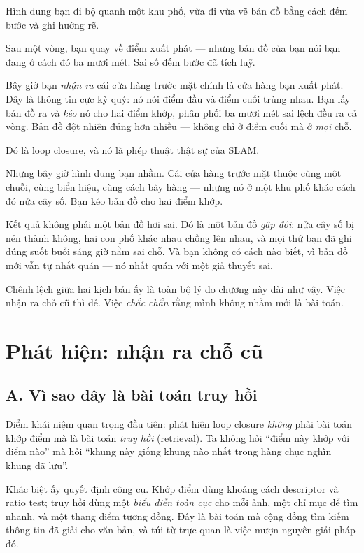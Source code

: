 \documentclass[../../vslam.tex]{subfiles}
\begin{document}
\begin{trucgiac}
Hình dung bạn đi bộ quanh một khu phố, vừa đi vừa vẽ bản đồ bằng cách đếm bước và ghi hướng rẽ.

Sau một vòng, bạn quay về điểm xuất phát --- nhưng bản đồ của bạn nói bạn đang ở cách đó ba mươi mét. Sai số đếm bước đã tích luỹ.

Bây giờ bạn \emph{nhận ra} cái cửa hàng trước mặt chính là cửa hàng bạn xuất phát. Đây là thông tin cực kỳ quý: nó nói điểm đầu và điểm cuối trùng nhau. Bạn lấy bản đồ ra và \emph{kéo} nó cho hai điểm khớp, phân phối ba mươi mét sai lệch đều ra cả vòng. Bản đồ đột nhiên đúng hơn nhiều --- không chỉ ở điểm cuối mà ở \emph{mọi} chỗ.

Đó là loop closure, và nó là phép thuật thật sự của SLAM.

Nhưng bây giờ hình dung bạn nhầm. Cái cửa hàng trước mặt thuộc cùng một chuỗi, cùng biển hiệu, cùng cách bày hàng --- nhưng nó ở một khu phố khác cách đó nửa cây số. Bạn kéo bản đồ cho hai điểm khớp.

Kết quả không phải một bản đồ hơi sai. Đó là một bản đồ \emph{gập đôi}: nửa cây số bị nén thành không, hai con phố khác nhau chồng lên nhau, và mọi thứ bạn đã ghi đúng suốt buổi sáng giờ nằm sai chỗ. Và bạn không có cách nào biết, vì bản đồ mới vẫn tự nhất quán --- nó nhất quán với một giả thuyết sai.

Chênh lệch giữa hai kịch bản ấy là toàn bộ lý do chương này dài như vậy. Việc nhận ra chỗ cũ thì dễ. Việc \emph{chắc chắn} rằng mình không nhầm mới là bài toán.
\end{trucgiac}

\section{Phát hiện: nhận ra chỗ cũ}

\subsection{A. Vì sao đây là bài toán truy hồi}

Điểm khái niệm quan trọng đầu tiên: phát hiện loop closure \emph{không} phải bài toán khớp điểm mà là bài toán \emph{truy hồi} (retrieval). Ta không hỏi ``điểm này khớp với điểm nào'' mà hỏi ``khung này giống khung nào nhất trong hàng chục nghìn khung đã lưu''.

Khác biệt ấy quyết định công cụ. Khớp điểm dùng khoảng cách descriptor và ratio test; truy hồi dùng một \emph{biểu diễn toàn cục} cho mỗi ảnh, một chỉ mục để tìm nhanh, và một thang điểm tương đồng. Đây là bài toán mà cộng đồng tìm kiếm thông tin đã giải cho văn bản, và túi từ trực quan là việc mượn nguyên giải pháp đó.
\end{document}
